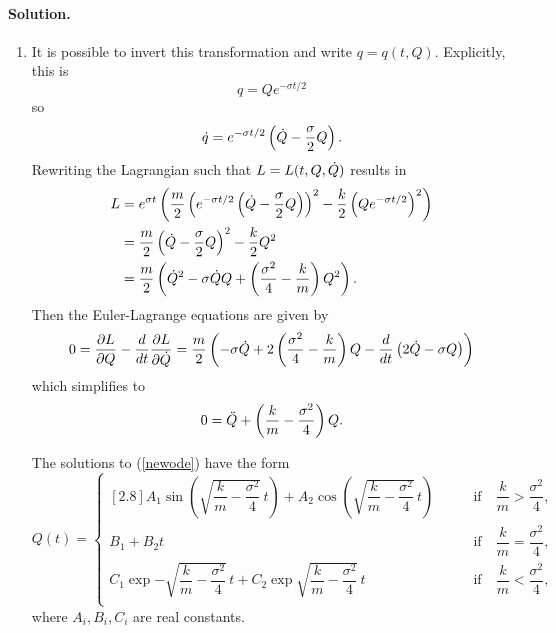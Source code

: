 \documentclass[11pt]{article}
\newcommand{\pder}[2]{\frac{\partial#1}{\partial#2}}
\newcommand{\der}[2]{\frac{d#1}{d#2}}
\newcommand{\refeq}[1]{(\ref{#1})}
\newenvironment{solution}
{
    \paragraph{Solution.}
    \ignorespaces
}
{
    \bigskip\bigskip
}
\begin{document}
\begin{enumerate}
\begin{solution}
\begin{enumerate}
		\item It is possible to invert this transformation and write $q = q(t, Q)$.  Explicitly, this is
			\begin{equation} \label{inversion}
				q = Q e^{-\sigma t / 2}
			\end{equation}
			so
			\begin{equation}
				\dot{q} = e^{-\sigma t / 2} \left(\dot{Q} - \frac{\sigma}{2} Q \right).
			\end{equation}
			Rewriting the Lagrangian such that $L = L(t, Q, \dot{Q})$ results in
			\begin{align}
				L &= e^{\sigma t} \left(\frac{m}{2} \left(e^{-\sigma t / 2} \left( \dot{Q} - \frac{\sigma}{2} Q \right) \right)^2 - \frac{k}{2} \left( Q e^{-\sigma t / 2} \right)^2 \right) \\
				&= \frac{m}{2} \left( \dot{Q} - \frac{\sigma}{2} Q \right)^2 - \frac{k}{2} Q^2 \\
				&= \label{lagrangian} \frac{m}{2} \left(\dot{Q}^2 - \sigma \dot{Q} Q + \left(\frac{\sigma^2}{4} - \frac{k}{m} \right) Q^2 \right).
			\end{align}
			Then the Euler-Lagrange equations are given by
			\begin{equation}
				0 = \pder{L}{Q} - \der{}{t} \pder{L}{\Qd} = \frac{m}{2} \left( -\sigma \Qd + 2 \left( \frac{\sigma^2}{4} - \frac{k}{m} \right) Q - \der{}{t} \left(2 \Qd - \sigma Q \right) \right)
			\end{equation}
			which simplifies to
			\begin{equation} \label{newode} 
				0 = \ddot{Q} + \left( \frac{k}{m} - \frac{\sigma^2}{4} \right) Q.
			\end{equation}
			
			The solutions to \refeq{newode} have the form
			\begin{equation}
				Q(t) = \begin{cases}[2.8]
						A_1 \sin\left(\sqrt{\dfrac{k}{m} - \dfrac{\sigma^2}{4}}\,t\right) + A_2 \cos\left(\sqrt{\dfrac{k}{m} - \dfrac{\sigma^2}{4}}\,t\right) \quad \quad &\text{if}\quad \dfrac{k}{m} > \dfrac{\sigma^2}{4}, \\
						B_1 + B_2 t \quad \quad &\text{if}\quad \dfrac{k}{m} = \dfrac{\sigma^2}{4}, \\
						C_1 \exp{-\sqrt{\dfrac{k}{m} - \dfrac{\sigma^2}{4}}\,t} + C_2 \exp{\sqrt{\dfrac{k}{m} - \dfrac{\sigma^2}{4}}\,t} \quad \quad &\text{if} \quad \dfrac{k}{m} < \dfrac{\sigma^2}{4}, \\
					\end{cases}
			\end{equation}
			where $A_i, B_i, C_i$ are real constants.
			

\end{enumerate}
\end{solution}
\end{enumerate}
\end{document}

